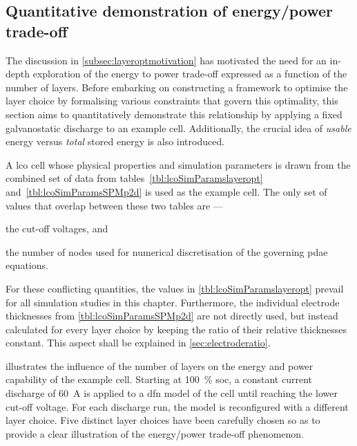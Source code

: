 
\subsection{Quantitative demonstration of energy/power trade-off}\label{sec:energypowertradeoffdemo}

The discussion in \cref{subsec:layeroptmotivation} has motivated the need for an
in-depth exploration of the energy to power trade-off expressed as a function of
the number of  layers. Before embarking on constructing a  framework to optimise
the layer choice by formalising various constraints that govern this optimality,
this section aims to quantitatively  demonstrate this relationship by applying a
fixed galvanostatic discharge to an example cell. Additionally, the crucial idea
of \emph{usable} energy versus \emph{total} stored energy is also introduced.

A  \gls{lco}  cell  whose  physical  properties  and  simulation  parameters  is
drawn from  the combined set of  data from tables~\ref{tbl:lcoSimParamslayeropt}
and~\ref{tbl:lcoSimParamsSPMp2d} is  used as the  example cell. The only  set of
values that overlap between these two tables are ---
\begin{enumerate*}[label=\itshape\alph*\upshape)]
    \item the cut-off voltages, and
    \item the number of nodes  used for numerical  discretisation of  the governing  \gls{pdae} equations.
\end{enumerate*}
For these conflicting quantities,  the values in \cref{tbl:lcoSimParamslayeropt}
prevail for all simulation studies  in this chapter. Furthermore, the individual
electrode thicknesses from \cref{tbl:lcoSimParamsSPMp2d}  are not directly used,
but  instead  calculated  for  every  layer  choice  by  keeping  the  ratio  of
their  relative  thicknesses  constant.  This   aspect  shall  be  explained  in
\cref{sec:electroderatio}.

  illustrates  the  influence  of  the  number
of  layers   on  the  energy   and  power   capability  of  the   example  cell.
Starting  at  \SI{100}{\percent}  \gls{soc},  a constant  current  discharge  of
\SI{60}{\ampere}\footnotemark{}  is applied  to a  \gls{dfn} model  of the  cell
until reaching the  lower cut-off voltage. For each discharge  run, the model is
reconfigured with  a different  layer choice. Five  distinct layer  choices have
been carefully chosen so as to  provide a clear illustration of the energy/power
trade-off phenomenon.

